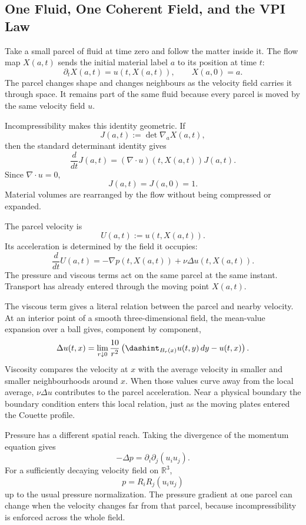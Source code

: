 \subsection{One Fluid, One Coherent Field, and the VPI Law}\label{sub:OneFluidOneCoherentFieldAndTheVPILaw}

Take a small parcel of fluid at time zero and follow the matter inside it.
The flow map \(X(a,t)\) sends the initial material label \(a\) to its position at time \(t\):
\[
  \partial_tX(a,t)=u(t,X(a,t)),
  \qquad
  X(a,0)=a.
\]
The parcel changes shape and changes neighbours as the velocity field carries it through space.
It remains part of the same fluid because every parcel is moved by the same velocity field \(u\).

Incompressibility makes this identity geometric.
If
\[
  J(a,t):=\det\nabla_aX(a,t),
\]
then the standard determinant identity gives
\[
  \frac{d}{dt}J(a,t)
  =
  (\nabla\cdot u)(t,X(a,t))J(a,t).
\]
Since \(\nabla\cdot u=0\),
\[
  J(a,t)=J(a,0)=1.
\]
Material volumes are rearranged by the flow without being compressed or expanded.

The parcel velocity is
\[
  U(a,t):=u(t,X(a,t)).
\]
Its acceleration is determined by the field it occupies:
\[
  \frac{d}{dt}U(a,t)
  =
  -\nabla p(t,X(a,t))
  +
  \nu\Delta u(t,X(a,t)).
\]
The pressure and viscous terms act on the same parcel at the same instant.
Transport has already entered through the moving point \(X(a,t)\).

The viscous term gives a literal relation between the parcel and nearby velocity.
At an interior point of a smooth three-dimensional field, the mean-value expansion over a ball gives, component by component,
\[
  \Delta u(t,x)
  =
  \lim_{r\downarrow0}
  \frac{10}{r^2}
  \left(
    \dashint_{B_r(x)}u(t,y)\,dy
    -
    u(t,x)
  \right).
\]
Viscosity compares the velocity at \(x\) with the average velocity in smaller and smaller neighbourhoods around \(x\).
When those values curve away from the local average, \(\nu\Delta u\) contributes to the parcel acceleration.
Near a physical boundary the boundary condition enters this local relation, just as the moving plates entered the Couette profile.

Pressure has a different spatial reach.
Taking the divergence of the momentum equation gives
\[
  -\Delta p
  =
  \partial_i\partial_j(u_i u_j).
\]
For a sufficiently decaying velocity field on \(\mathbb R^3\),
\[
  p
  =
  R_iR_j(u_i u_j)
\]
up to the usual pressure normalization.
The pressure gradient at one parcel can change when the velocity changes far from that parcel, because incompressibility is enforced across the whole field.

